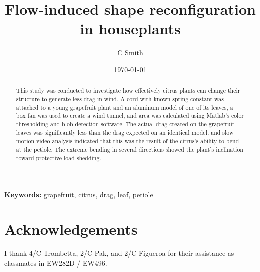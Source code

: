 \documentclass{article}
\title{Flow-induced shape reconfiguration in houseplants}
\author{C Smith}
\date{\today}
\begin{document}
\maketitle
\begin{abstract}
This study was conducted to investigate how effectively citrus plants can change their structure to generate less drag in wind. A cord with known spring constant was attached to a young grapefruit plant and an aluminum model of one of its leaves, a box fan was used to create a wind tunnel, and area was calculated using Matlab's color thresholding and blob detection software. The actual drag created on the grapefruit leaves was significantly less than the drag expected on an identical model, and slow motion video analysis indicated that this was the result of the citrus's ability to bend at the petiole. The extreme bending in several directions showed the plant's inclination toward protective load shedding.
\end{abstract}

{\scriptsize\textbf{Keywords: }grapefruit, citrus, drag, leaf, petiole}


\section{Acknowledgements}
I thank 4/C Trombetta, 2/C Pak, and 2/C Figueroa for their assistance as classmates in EW282D / EW496. 



%
\end{document}

